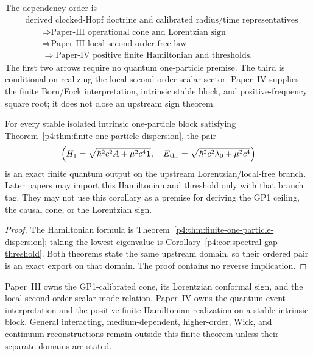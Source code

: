 \documentclass[12pt,a4paper]{article}
\begin{document}
\begin{remark}
\label{p4:rem:no-circularity-p3-dispersion}
\label{p4:rem:lorentzian-noncircular}
The dependency order is
\[
\begin{aligned}
&\text{derived clocked-Hopf doctrine and calibrated radius/time representatives}\\
&\qquad\Longrightarrow
\text{Paper-III operational cone and Lorentzian sign}\\
&\qquad\Longrightarrow
\text{Paper-III local second-order free law}\\
&\qquad\Longrightarrow
\text{Paper-IV positive finite Hamiltonian and thresholds}.
\end{aligned}
\]
The first two arrows require no quantum one-particle premise.  The third is
conditional on realizing the local second-order scalar sector.  Paper~IV
supplies the finite Born/Fock interpretation, intrinsic stable block, and
positive-frequency square root; it does not close an upstream sign theorem.
\end{remark}

\begin{corollary}
\label{p4:cor:closes-p3-lorentzian-input}
For every stable isolated intrinsic one-particle block satisfying
Theorem~\ref{p4:thm:finite-one-particle-dispersion}, the pair
\[
\left(
H_1=\sqrt{\hbar^2c^2A+\mu^2c^4\mathbf1},
\quad
E_{\rm thr}
=\sqrt{\hbar^2c^2\lambda_0+\mu^2c^4}
\right)
\]
is an exact finite quantum output on the upstream Lorentzian/local-free
branch.  Later papers may import this Hamiltonian and threshold only with
that branch tag.  They may not use this corollary as a premise for deriving
the GP1 ceiling, the causal cone, or the Lorentzian sign.
\end{corollary}

\begin{proof}
The Hamiltonian formula is
Theorem~\ref{p4:thm:finite-one-particle-dispersion}; taking the lowest
eigenvalue is Corollary~\ref{p4:cor:spectral-gap-threshold}.  Both theorems
state the same upstream domain, so their ordered pair is an exact export on
that domain.  The proof contains no reverse implication.
\end{proof}

\begin{remark}
\label{p4:rem:reciprocal-p3-lorentzian-closure}
Paper~III owns the GP1-calibrated cone, its Lorentzian conformal sign, and the
local second-order scalar mode relation.  Paper~IV owns the quantum-event
interpretation and the positive finite Hamiltonian realization on a stable
intrinsic block.  General interacting, medium-dependent, higher-order, Wick,
and continuum reconstructions remain outside this finite theorem unless
their separate domains are stated.
\end{remark}
\end{document}

